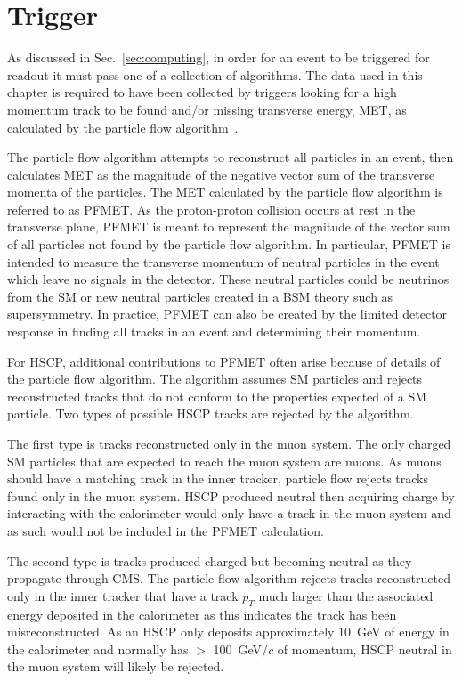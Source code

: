 \section{Trigger \label{sec:trigger}}
As discussed in Sec.~\ref{sec:computing}, in order for an event to be triggered for readout it must pass one of a collection of algorithms.
The data used in this chapter is required to have been collected by triggers looking for a high momentum track to be found
and/or missing transverse energy, MET, as calculated by the particle flow algorithm~\cite{Chatrchyan:2011tn}. 

The particle flow algorithm attempts
to reconstruct all particles in an event, then calculates MET as the magnitude of the negative vector sum of the transverse momenta of the particles. 
The MET calculated by the particle flow algorithm is referred to as PFMET.
As the proton-proton collision occurs
at rest in the transverse plane, PFMET is meant to represent the magnitude of the vector sum of all particles not found by the particle flow algorithm.
In particular, PFMET is intended to measure the transverse momentum of neutral particles in the event which leave no signals in the detector.
These neutral particles could be neutrinos from the SM or new neutral particles created in a BSM theory such as supersymmetry.
In practice, PFMET can also be created by the limited detector response in finding all tracks in an event and determining their momentum.

For HSCP, additional contributions to PFMET often arise because of details of the particle flow algorithm.
The algorithm assumes SM particles and rejects reconstructed tracks that do not conform to the properties expected
of a SM particle. Two types of possible HSCP tracks are rejected by the algorithm. 

The first type is tracks reconstructed only in the muon system. The only charged SM particles that
are expected to reach the muon system are muons. As muons should have a matching track in the inner tracker, particle flow rejects tracks found only in the
muon system. HSCP produced neutral then acquiring charge by interacting with the calorimeter
would only have a track in the muon system and as such would not be included in the PFMET calculation. 

The second type is tracks produced charged but becoming neutral as they propagate through CMS.
The particle flow algorithm rejects tracks reconstructed only in the inner tracker that have a track $p_T$ much larger
than the associated energy deposited in the calorimeter as this indicates the track has been misreconstructed.
As an HSCP only deposits approximately 10~GeV of energy in the calorimeter and normally has $>$ 100~GeV/$c$ of momentum, HSCP neutral in the muon system will likely be rejected. 

